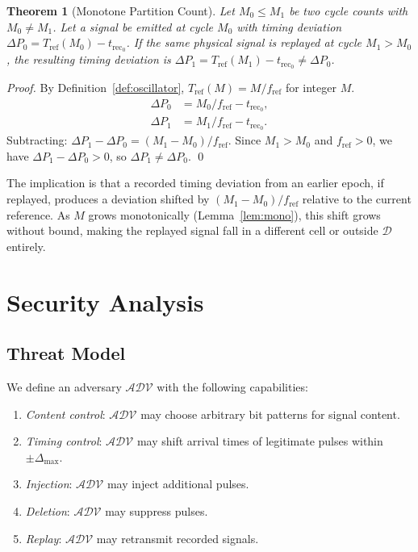 \documentclass[twocolumn,10pt]{article}
\newtheorem{theorem}{Theorem}[section]
\newcommand{\DP}{\Delta P}          %
\newcommand{\Tref}{T_{\mathrm{ref}}}
\newcommand{\trec}{t_{\mathrm{rec}}}
\newcommand{\fref}{f_{\mathrm{ref}}}
\newcommand{\calD}{\mathcal{D}}     %
\begin{document}
\begin{theorem}[Monotone Partition Count]
\label{thm:mono-partition}
Let $M_0 \leq M_1$ be two cycle counts with $M_0 \neq M_1$.
Let a signal be emitted at cycle $M_0$ with timing deviation
$\DP_0 = \Tref(M_0) - \trec_0$. If the same physical signal
is replayed at cycle $M_1 > M_0$, the resulting timing deviation
is $\DP_1 = \Tref(M_1) - \trec_0 \neq \DP_0$.
\end{theorem}
\begin{proof}
By Definition~\ref{def:oscillator},
$\Tref(M) = M / \fref$ for integer $M$.
\begin{align}
  \DP_0 &= M_0/\fref - \trec_0, \label{eq:dp0} \\
  \DP_1 &= M_1/\fref - \trec_0. \label{eq:dp1}
\end{align}
Subtracting: $\DP_1 - \DP_0 = (M_1 - M_0)/\fref$.
Since $M_1 > M_0$ and $\fref > 0$, we have $\DP_1 - \DP_0 > 0$,
so $\DP_1 \neq \DP_0$. \qed
\end{proof}

The implication is that a recorded timing deviation from an earlier
epoch, if replayed, produces a deviation shifted by $(M_1 - M_0)/\fref$
relative to the current reference. As $M$ grows monotonically
(Lemma~\ref{lem:mono}), this shift grows without bound, making the
replayed signal fall in a different cell or outside $\calD$ entirely.

\section{Security Analysis}
\label{sec:security}

\subsection{Threat Model}

We define an adversary $\mathcal{ADV}$ with the following
capabilities:
\begin{enumerate}[leftmargin=1.5em,topsep=2pt,itemsep=1pt]
  \item[\textbf{C1}] \emph{Content control}: $\mathcal{ADV}$ may
    choose arbitrary bit patterns for signal content.
  \item[\textbf{C2}] \emph{Timing control}: $\mathcal{ADV}$ may
    shift arrival times of legitimate pulses within $\pm \Delta_{\max}$.
  \item[\textbf{C3}] \emph{Injection}: $\mathcal{ADV}$ may inject
    additional pulses.
  \item[\textbf{C4}] \emph{Deletion}: $\mathcal{ADV}$ may suppress
    pulses.
  \item[\textbf{C5}] \emph{Replay}: $\mathcal{ADV}$ may retransmit
    recorded signals.
\end{enumerate}
\end{document}
